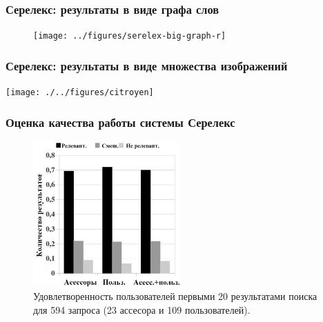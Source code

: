 \begin{frame}
\frametitle{Серелекс: результаты в виде графа слов}

\begin{figure}
\centering
\texttt{[image: ../figures/serelex-big-graph-r]}
\end{figure}

\end{frame}






\begin{frame}
\frametitle{Серелекс: результаты в виде множества изображений}

\texttt{[image: ./../figures/citroyen]}

\end{frame}





\begin{frame}
\frametitle{Оценка качества работы системы Серелекс}

\begin{figure}
\center
\includegraphics[width=0.5\textwidth]{serelex-eval}

\caption{Удовлетворенность пользователей первыми 20 результатами поиска для
594 запроса (23 ассесора и 109 пользователей).}
\end{figure}
\end{frame}




